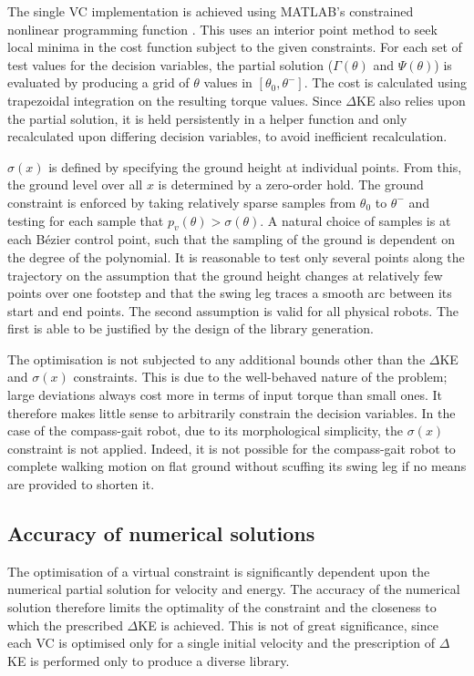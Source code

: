 The single VC implementation is achieved using MATLAB's constrained nonlinear programming function . This uses an interior point method to seek local minima in the cost function subject to the given constraints. For each set of test values for the decision variables, the partial solution ($\Gamma(\theta)$ and $\Psi(\theta)$) is evaluated by producing a grid of $\theta$ values in $[\theta_0, \theta^-]$. The cost is calculated using trapezoidal integration on the resulting torque values. Since $\Delta$KE also relies upon the partial solution, it is held persistently in a helper function and only recalculated upon differing decision variables, to avoid inefficient recalculation.

$\sigma(x)$ is defined by specifying the ground height at individual points. From this, the ground level over all $x$ is determined by a zero-order hold. The ground constraint is enforced by taking relatively sparse samples from $\theta_0$ to $\theta^-$ and testing for each sample that $p_v(\theta)>\sigma(\theta)$. A natural choice of samples is at each Bézier control point, such that the sampling of the ground is dependent on the degree of the polynomial. It is reasonable to test only several points along the trajectory on the assumption that the ground height changes at relatively few points over one footstep and that the swing leg traces a smooth arc between its start and end points. The second assumption is valid for all physical robots. The first is able to be justified by the design of the library generation.

The optimisation is not subjected to any additional bounds other than the $\Delta$KE and $\sigma(x)$ constraints. This is due to the well-behaved nature of the problem; large deviations always cost more in terms of input torque than small ones. It therefore makes little sense to arbitrarily constrain the decision variables. In the case of the compass-gait robot, due to its morphological simplicity, the $\sigma(x)$ constraint is not applied. Indeed, it is not possible for the compass-gait robot to complete walking motion on flat ground without scuffing its swing leg if no means are provided to shorten it.

\subsection{Accuracy of numerical solutions}
The optimisation of a virtual constraint is significantly dependent upon the numerical partial solution for velocity and energy. The accuracy of the numerical solution therefore limits the optimality of the constraint and the closeness to which the prescribed $\Delta$KE is achieved. This is not of great significance, since each VC is optimised only for a single initial velocity and the prescription of $\Delta$KE is performed only to produce a diverse library.

